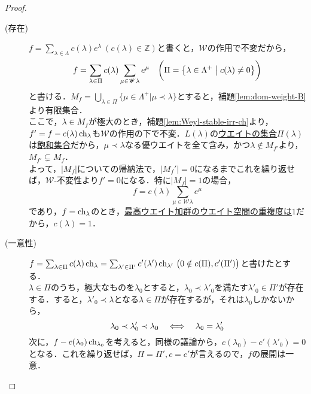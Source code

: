 \documentclass[rep_main]{subfiles}
\begin{document}
\begin{proof}
	\begin{description}
		\item[(存在)] $f = \sum_{\lambda \in \Lambda} c(\lambda)e^\lambda\ (c(\lambda) \in \mathbb{Z})$と書くと，$\mathscr{W}$の作用で不変だから，
		\begin{equation}
			f = \sum_{\lambda \in \Pi} c(\lambda) \sum_{\mu \in \mathscr{W}\lambda} e^\mu\quad  \biggl(\Pi = \bigl\{\lambda \in \Lambda^+ \bigm| c(\lambda) \neq 0\bigr\}\biggr)
		\end{equation}
		と書ける．$M_f = \bigcup_{\lambda \in \Pi} \{\mu \in \Lambda^+ | \mu \prec \lambda\}$とすると，補題\ref{lem:dom-weight-B}より有限集合．\\
		ここで，$\lambda \in M_f$が極大のとき，補題\ref{lem:Weyl-stable-irr-ch}より，$f' = f - c(\lambda)\operatorname{ch}_\lambda$も$\mathscr{W}$の作用の下で不変．$L(\lambda)$の\hyperref[def:weight-rep]{ウエイトの集合}$\Pi(\lambda)$は\hyperref[def:weight-saturated]{飽和集合}だから，$\mu \prec \lambda$なる優ウエイトを全て含み，かつ$\lambda \notin M_{f'}$より，$M_{f'} \subsetneq M_f$．\\
		よって，$|M_f|$についての帰納法で，$|M_f'| = 0$になるまでこれを繰り返せば，$\mathscr{W}$-不変性より$f' = 0$になる．特に$|M_f| = 1$の場合，
		\begin{equation}
			f = c(\lambda) \sum_{\mu \in \mathscr{W}\lambda} e^\mu
		\end{equation}
		であり，$f = \operatorname{ch}_\lambda$のとき，\hyperref[thm:hwmodule-c]{最高ウエイト加群のウエイト空間の\hyperref[def:mutiplicity]{重複度}は$1$}だから，$c(\lambda) = 1$．
		\item[(一意性)] $f = \sum_{\lambda \in \Pi} c(\lambda)\operatorname{ch}_\lambda = \sum_{\lambda' \in \Pi'} c'(\lambda')\operatorname{ch}_{\lambda'}\ \bigl(0 \notin c(\Pi), c'(\Pi')\bigr)$と書けたとする．\\
		$\lambda \in \Pi$のうち，極大なものを$\lambda_0$とすると，$\lambda_0 \prec \lambda'_0$を満たす$\lambda'_0 \in \Pi'$が存在する．すると，$\lambda'_0 \prec \lambda$となる$\lambda \in \Pi$が存在するが，それは$\lambda_0$しかないから，
		\begin{equation}
			\lambda_0 \prec \lambda'_0 \prec \lambda_0  \quad \Longleftrightarrow \quad  \lambda_0 = \lambda'_0
		\end{equation}
		次に，$f - c(\lambda_0)\operatorname{ch}_{\lambda_0}$を考えると，同様の議論から，$c(\lambda_0) - c'(\lambda'_0) = 0$となる．これを繰り返せば，$\Pi = \Pi', c = c'$が言えるので，$f$の展開は一意．
	\end{description}
\end{proof}
\end{document}

